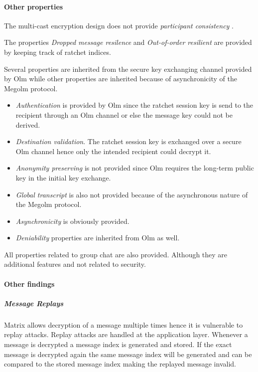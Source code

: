 \paragraph{Other properties}

The multi-cast encryption design does not provide \emph{participant consistency} \cite{sok}.

The properties \emph{Dropped message resilence} and \emph{Out-of-order resilient} are provided by keeping track of ratchet indices. 

Several properties are inherited from the secure key exchanging channel provided by Olm while other properties are inherited because of asynchronicity of the Megolm protocol.

\begin{itemize}
	
	\item \emph{Authentication} is provided by Olm since the ratchet session key is send to the recipient through an Olm channel or else the message key could not be derived.
	\item \emph{Destination validation}. The ratchet session key is exchanged over a secure Olm channel hence only the intended recipient could decrypt it.
	\item \emph{Anonymity preserving} is not provided since Olm requires the long-term public key in the initial key exchange.
	\item \emph{Global transcript} is also not provided because of the asynchronous nature of the Megolm protocol.  
	\item \emph{Asynchronicity} is obviously provided.
	\item \emph{Deniability} properties are inherited from Olm as well.
\end{itemize}

All properties related to group chat are also provided. Although they are additional features and not related to security. 


\paragraph{Other findings}

\subparagraph{Message Replays}

Matrix allows decryption of a message multiple times hence it is vulnerable to replay attacks. Replay attacks are handled at the application layer. Whenever a message is decrypted a message index is generated and stored. If the exact message is decrypted again the same message index will be generated and can be compared to the stored message index making the replayed message invalid. 

